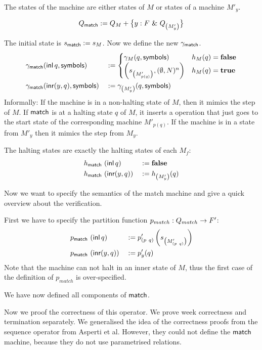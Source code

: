 \documentclass{psartcl}
\begin{document}
The states of the machine are either states of $M$ or states of a machine $M'_y$.

$$Q_{\textsf{match}} := Q_M + \bigl\{ y:F~{\&}~Q_{ \left( M'_{y} \right) } \bigr \}$$

The initial state is $s_{\textsf{match}} := s_M$.  Now we define the new $\gamma_{\textsf{match}}$.
\begin{alignat*}{2}
  \gamma_{\textsf{match}} & (\operatorname{\textsf{inl}} q, \textsf{symbols}) &&:=
  \begin{cases}
    \gamma_{M}(q, \textsf{symbols})                                & h_M(q) = \mathbf{false} \\
    \left( s_{\left(M'_{p(q)}\right)}, (\emptyset, N)^n \right)  & h_M(q) = \mathbf{true}
  \end{cases} \\
  \gamma_{\textsf{match}} & (\operatorname{\textsf{inr}} (y, q), \textsf{symbols}) &&:= \gamma_{\left({M'_y}\right)}(q, \textsf{symbols})
\end{alignat*}
Informally:  If the machine is in a non-halting state of $M$, then it mimics the step of $M$.  If $\textsf{match}$ is at a halting state $q$ of $M$, it
inserts a operation that just goes to the start state of the corresponding machine $M'_{p(q)}$.  If the machine is in a state from $M'_y$ then it
mimics the step from $M_y$.

The halting states are exactly the halting states of each $M_f$:
\begin{alignat*}{3}
  h_{\textsf{match}} &~ (\operatorname{\textsf{inl}}      q) &&:= \mathbf{false} \\
  h_{\textsf{match}} &~ (\operatorname{\textsf{inr}} (y, q)) &&:= h_{\left( M'_y \right)}(q)
\end{alignat*}

Now we want to specify the semantics of the match machine and give a quick overview about the verification.

First we have to specify the partition function $p_{match} : Q_{match} \rightarrow F'$:
\begin{alignat*}{3}
  p_{\textsf{match}} &~ (\operatorname{\textsf{inl}}      q) &&:= p'_{\left({p~q}\right)} \left( s_{ \left( M'_{ \left( p~q \right) } \right) } \right) \\
  p_{\textsf{match}} &~ (\operatorname{\textsf{inr}} (y, q)) &&:= p'_y(q)
\end{alignat*}
Note that the machine can not halt in an inner state of $M$, thus the first case of the definition of $p_{match}$ is over-specified.

We have now defined all components of $\textsf{match}$.

Now we proof the correctness of this operator.  We prove week correctness and termination separately.
We generalised the idea of the correctness proofs from the sequence operator from Asperti et al.
However, they could not define the $\textsf{match}$ machine, because they do not use parametrised relations.
\end{document}
